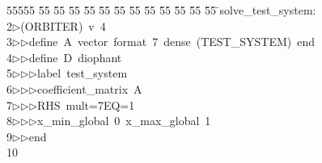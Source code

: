 %
%
\begin{tabbing}
55555 \= 55 \= 55 \= 55 \= 55 \= 55 \= 55 \= 55 \= 55 \= 55 \= 55 \= 55 \= 55 \= \>solve\_test\_system:\\[0pt]
2\>$\triangleright$\>(ORBITER)\ v\ 4\ \\[0pt]
3\>$\triangleright$\>$\triangleright$\>define\ A\ vector\ format\ 7\ dense\ (TEST\_SYSTEM)\ end\ \\[0pt]
4\>$\triangleright$\>$\triangleright$\>define\ D\ diophant\ \\[0pt]
5\>$\triangleright$\>$\triangleright$\>$\triangleright$\>label\ test\_system\ \\[0pt]
6\>$\triangleright$\>$\triangleright$\>$\triangleright$\>coefficient\_matrix\ A\ \\[0pt]
7\>$\triangleright$\>$\triangleright$\>$\triangleright$\>RHS\ mult=7EQ=1\ \\[0pt]
8\>$\triangleright$\>$\triangleright$\>$\triangleright$\>x\_min\_global\ 0\ x\_max\_global\ 1\ \\[0pt]
9\>$\triangleright$\>$\triangleright$\>end\\[0pt]
10\>\end{tabbing}
